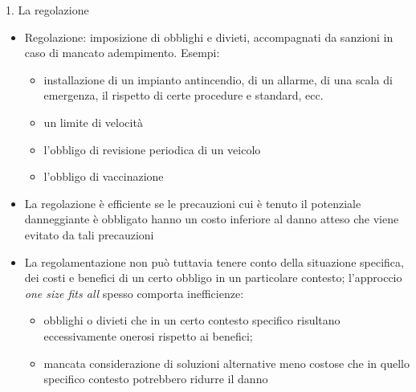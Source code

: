 \documentclass[aspectratio=64,11pt]{beamer}
\begin{document}
\begin{frame}{1. La regolazione}
\begin{itemize}
\item \alert{Regolazione}: imposizione di obblighi e divieti, accompagnati da sanzioni in
caso di mancato adempimento. Esempi:
\begin{itemize}
\item installazione di un impianto antincendio, di un allarme, di una scala di
emergenza, il rispetto di certe procedure e standard, ecc.
\item un limite di velocità
\item l’obbligo di revisione periodica di un veicolo
\item l’obbligo di vaccinazione
\end{itemize}
\item La regolazione è \alert{efficiente} se le precauzioni cui è tenuto il potenziale
danneggiante è obbligato hanno un costo inferiore al danno atteso che viene
evitato da tali precauzioni
\item La regolamentazione non può tuttavia tenere conto della situazione
specifica, dei costi e benefici di un certo obbligo in un particolare
contesto; l'approccio \emph{one size fits all} spesso comporta inefficienze:
\begin{itemize}
\item obblighi o divieti che in un certo contesto specifico risultano
eccessivamente onerosi rispetto ai benefici;
\item mancata considerazione di soluzioni alternative meno costose che in quello
specifico contesto potrebbero ridurre il danno
\end{itemize}
\end{itemize}
\end{frame}
\end{document}
